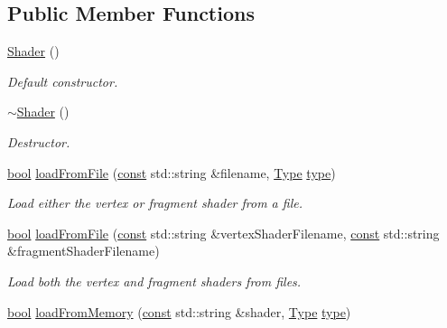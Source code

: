 \subsection*{Public Member Functions}
\begin{DoxyCompactItemize}
\item 
\hyperlink{classsf_1_1_shader_a1d7f28f26b4122959fcafec871c2c3c5}{Shader} ()
\begin{DoxyCompactList}\small\item\em Default constructor. \end{DoxyCompactList}\item 
\hyperlink{classsf_1_1_shader_a4bac6cc8b046ecd8fb967c145a2380e6}{$\sim$\-Shader} ()
\begin{DoxyCompactList}\small\item\em Destructor. \end{DoxyCompactList}\item 
\hyperlink{term__entry_8h_a002004ba5d663f149f6c38064926abac}{bool} \hyperlink{classsf_1_1_shader_a053a5632848ebaca2fcd8ba29abe9e6e}{load\-From\-File} (\hyperlink{term__entry_8h_a57bd63ce7f9a353488880e3de6692d5a}{const} std\-::string \&filename, \hyperlink{classsf_1_1_shader_afaa1aa65e5de37b74d047da9def9f9b3}{Type} \hyperlink{_entity_8cpp_aa209819775142a76b8e49319d79ecab2}{type})
\begin{DoxyCompactList}\small\item\em Load either the vertex or fragment shader from a file. \end{DoxyCompactList}\item 
\hyperlink{term__entry_8h_a002004ba5d663f149f6c38064926abac}{bool} \hyperlink{classsf_1_1_shader_ac9d7289966fcef562eeb92271c03e3dc}{load\-From\-File} (\hyperlink{term__entry_8h_a57bd63ce7f9a353488880e3de6692d5a}{const} std\-::string \&vertex\-Shader\-Filename, \hyperlink{term__entry_8h_a57bd63ce7f9a353488880e3de6692d5a}{const} std\-::string \&fragment\-Shader\-Filename)
\begin{DoxyCompactList}\small\item\em Load both the vertex and fragment shaders from files. \end{DoxyCompactList}\item 
\hyperlink{term__entry_8h_a002004ba5d663f149f6c38064926abac}{bool} \hyperlink{classsf_1_1_shader_ac92d46bf71dff2d791117e4e472148aa}{load\-From\-Memory} (\hyperlink{term__entry_8h_a57bd63ce7f9a353488880e3de6692d5a}{const} std\-::string \&shader, \hyperlink{classsf_1_1_shader_afaa1aa65e5de37b74d047da9def9f9b3}{Type} \hyperlink{_entity_8cpp_aa209819775142a76b8e49319d79ecab2}{type})

\end{DoxyCompactItemize}
